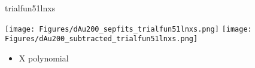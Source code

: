 \documentclass[aspectratio=169,compress,10pt]{beamer}
\begin{document}
\begin{frame}{trialfun51lnxs}
\begin{center}
\texttt{[image: Figures/dAu200\_sepfits\_trialfun51lnxs.png]}
\texttt{[image: Figures/dAu200\_subtracted\_trialfun51lnxs.png]}
\end{center}
\begin{itemize}
\item X polynomial
\end{itemize}
\end{frame}


\end{document}
